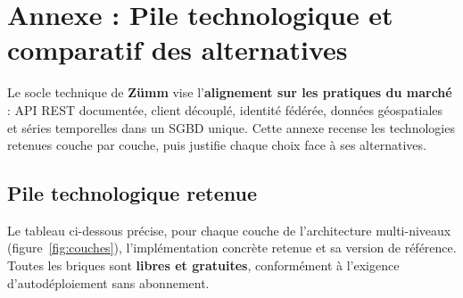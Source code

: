 
\chapter{Annexe : Pile technologique et comparatif des alternatives}
\label{chap:technologies}
Le socle technique de \textbf{Zümm} vise l'\textbf{alignement sur les pratiques
du marché} : API REST documentée, client découplé, identité fédérée, données
géospatiales et séries temporelles dans un SGBD unique. Cette annexe recense les
technologies retenues couche par couche, puis justifie chaque choix face à ses
alternatives.

\section{Pile technologique retenue}
Le tableau ci-dessous précise, pour chaque couche de l'architecture
multi-niveaux (figure~\ref{fig:couches}), l'implémentation concrète retenue et
sa version de référence. Toutes les briques sont \textbf{libres et gratuites},
conformément à l'exigence d'autodéploiement sans abonnement.

